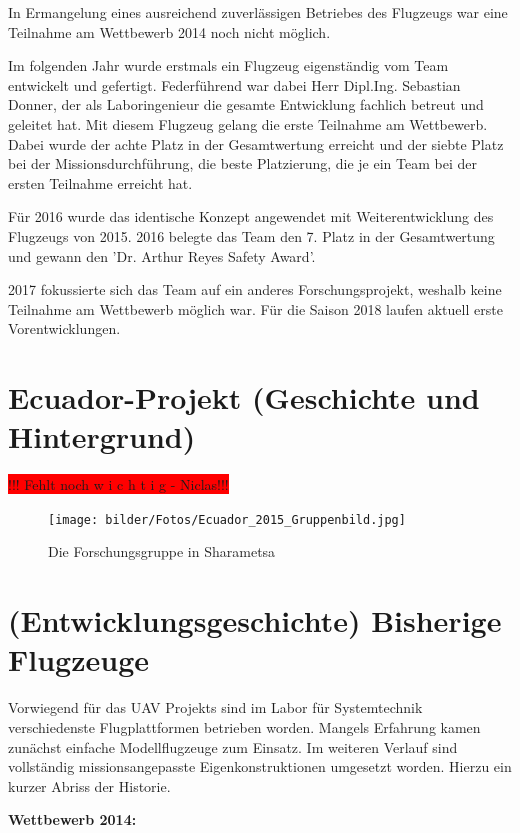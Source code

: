In Ermangelung eines ausreichend zuverlässigen Betriebes des Flugzeugs war eine Teilnahme am Wettbewerb 2014 noch nicht möglich.

Im folgenden Jahr wurde erstmals ein Flugzeug eigenständig vom Team entwickelt und gefertigt. Federführend war dabei Herr Dipl.Ing. Sebastian Donner, der als Laboringenieur die gesamte Entwicklung fachlich betreut und geleitet hat. Mit diesem Flugzeug gelang die erste Teilnahme am Wettbewerb. Dabei wurde der achte Platz in der Gesamtwertung erreicht und der siebte Platz bei der Missionsdurchführung, die beste Platzierung, die je ein Team bei der ersten Teilnahme erreicht hat.   

Für 2016 wurde das identische Konzept angewendet mit Weiterentwicklung des Flugzeugs von 2015. 2016 belegte das Team den 7. Platz in der Gesamtwertung und gewann den 'Dr. Arthur Reyes Safety Award'.

2017 fokussierte sich das Team auf ein anderes Forschungsprojekt, weshalb keine Teilnahme am Wettbewerb möglich war. Für die Saison 2018 laufen aktuell erste Vorentwicklungen.

\section{Ecuador-Projekt (Geschichte und Hintergrund)}

\colorbox{red}{!!! Fehlt noch w i c h t i g - Niclas!!!} \cite{Niclas}

\begin{figure}[H]
\centering
\texttt{[image: bilder/Fotos/Ecuador\_2015\_Gruppenbild.jpg]} 
\caption{Die Forschungsgruppe in Sharametsa} 
\label{Die Forschungsgruppe in Sharametsa}
\end{figure}

\clearpage

\section{(Entwicklungsgeschichte) Bisherige Flugzeuge}

Vorwiegend für das UAV Projekts sind im Labor für Systemtechnik verschiedenste Flugplattformen betrieben worden. Mangels Erfahrung kamen zunächst einfache Modellflugzeuge zum Einsatz. Im weiteren Verlauf sind vollständig missionsangepasste Eigenkonstruktionen umgesetzt worden.
Hierzu ein kurzer Abriss der Historie.

\vspace{7.5mm}

\textbf{Wettbewerb 2014:}

